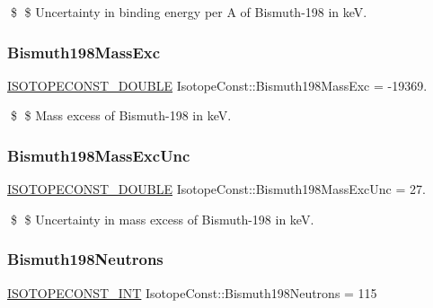 \$ \$ Uncertainty in binding energy per A of Bismuth-\/198 in keV. \mbox{\label{group___isotope_const-_bismuth-_bi198_ga49145223b47bc3b27512714b2fba7e4c}} 
\subsubsection{\texorpdfstring{Bismuth198\+Mass\+Exc}{Bismuth198MassExc}}
{\footnotesize\ttfamily \mbox{\hyperlink{group___isotope_const-_macros_ga8f45a7272ce02c0b4c65c44636ed719a}{I\+S\+O\+T\+O\+P\+E\+C\+O\+N\+S\+T\+\_\+\+D\+O\+U\+B\+LE}} Isotope\+Const\+::\+Bismuth198\+Mass\+Exc = -\/19369.}

\$ \$ Mass excess of Bismuth-\/198 in keV. \mbox{\label{group___isotope_const-_bismuth-_bi198_gaed5900e751c7eddef7ae6458aca53720}} 
\subsubsection{\texorpdfstring{Bismuth198\+Mass\+Exc\+Unc}{Bismuth198MassExcUnc}}
{\footnotesize\ttfamily \mbox{\hyperlink{group___isotope_const-_macros_ga8f45a7272ce02c0b4c65c44636ed719a}{I\+S\+O\+T\+O\+P\+E\+C\+O\+N\+S\+T\+\_\+\+D\+O\+U\+B\+LE}} Isotope\+Const\+::\+Bismuth198\+Mass\+Exc\+Unc = 27.}

\$ \$ Uncertainty in mass excess of Bismuth-\/198 in keV. \mbox{\label{group___isotope_const-_bismuth-_bi198_ga776fc61e3a20c020d59746cb0a019fec}} 
\subsubsection{\texorpdfstring{Bismuth198\+Neutrons}{Bismuth198Neutrons}}
{\footnotesize\ttfamily \mbox{\hyperlink{group___isotope_const-_macros_ga5f18360b3e99483a35c32d789e62621c}{I\+S\+O\+T\+O\+P\+E\+C\+O\+N\+S\+T\+\_\+\+I\+NT}} Isotope\+Const\+::\+Bismuth198\+Neutrons = 115}

